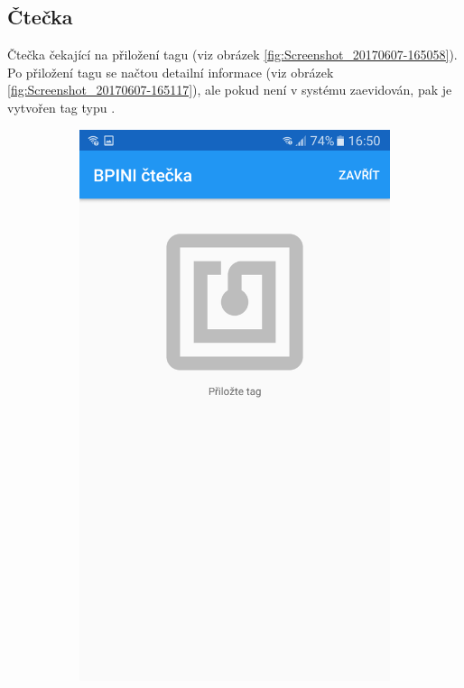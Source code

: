 \documentclass[czech,BP]{thesiskiv}
\begin{document}
\subsection{Čtečka}
Čtečka čekající na přiložení tagu (viz obrázek \ref{fig:Screenshot_20170607-165058}).
Po přiložení tagu se načtou detailní informace (viz obrázek \ref{fig:Screenshot_20170607-165117}), ale pokud není v systému zaevidován, pak je vytvořen tag typu .
\begin{figure}[H]
	\centering
  \begin{subfigure}[b]{0.3\textwidth}
    \centering
	\includegraphics[width=\textwidth]{../images/client_android/Screenshot_20170607-165058.png}	

\end{subfigure}
\end{figure}
\end{document}
